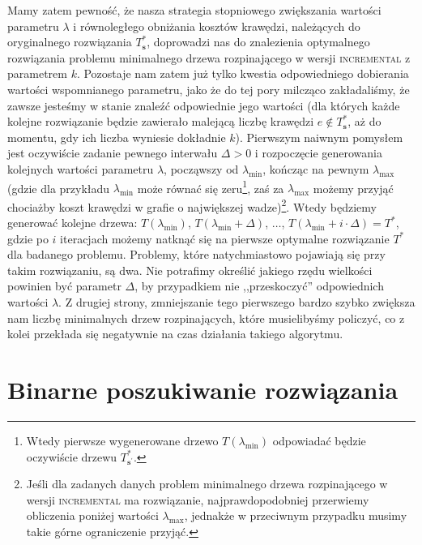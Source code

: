 Mamy zatem pewność, że nasza strategia stopniowego zwiększania wartości parametru $\lambda$ i równoległego obniżania kosztów krawędzi, należących do oryginalnego rozwiązania $T^{\ast}_{\textbf{s}}$, doprowadzi nas do znalezienia optymalnego rozwiązania problemu minimalnego drzewa rozpinającego w wersji \textsc{incremental} z parametrem $k$. Pozostaje nam zatem już tylko kwestia odpowiedniego dobierania wartości wspomnianego parametru, jako że do tej pory milcząco zakładaliśmy, że zawsze jesteśmy w stanie znaleźć odpowiednie jego wartości (dla których każde kolejne rozwiązanie będzie zawierało malejącą liczbę krawędzi $e \notin T^{\ast}_{\textbf{s}}$, aż do momentu, gdy ich liczba wyniesie dokładnie $k$). Pierwszym naiwnym pomysłem jest oczywiście zadanie pewnego interwału $\Delta > 0$ i rozpoczęcie generowania kolejnych wartości parametru $\lambda$, począwszy od $\lambda_{\text{min}}$, kończąc na pewnym $\lambda_{\text{max}}$ (gdzie dla przykładu $\lambda_{\text{min}}$ może równać się zeru\footnote{Wtedy pierwsze wygenerowane drzewo $T \left( \lambda_{\text{min}} \right)$ odpowiadać będzie oczywiście drzewu $T^{\ast}_{\textbf{s}^{\prime}}$.}, zaś za $\lambda_{\text{max}}$ możemy przyjąć chociażby koszt krawędzi w grafie o największej wadze)\footnote{Jeśli dla zadanych danych problem minimalnego drzewa rozpinającego w wersji \textsc{incremental} ma rozwiązanie, najprawdopodobniej przerwiemy obliczenia poniżej wartości $\lambda_{\text{max}}$, jednakże w przeciwnym przypadku musimy takie górne ograniczenie przyjąć.}. Wtedy będziemy generować kolejne drzewa: $T \left( \lambda_{\text{min}} \right)$, $T \left( \lambda_{\text{min}} + \Delta \right)$, $\dots$, $T \left( \lambda_{\text{min}} + i \cdot \Delta \right) = T^{\ast}$, gdzie po $i$ iteracjach możemy natknąć się na pierwsze optymalne rozwiązanie $T^{\ast}$ dla badanego problemu. Problemy, które natychmiastowo pojawiają się przy takim rozwiązaniu, są dwa. Nie potrafimy określić jakiego rzędu wielkości powinien być parametr $\Delta$, by przypadkiem nie ,,przeskoczyć'' odpowiednich wartości $\lambda$. Z drugiej strony, zmniejszanie tego pierwszego bardzo szybko zwiększa nam liczbę minimalnych drzew rozpinających, które musielibyśmy policzyć, co z kolei przekłada się negatywnie na czas działania takiego algorytmu.

\section{Binarne poszukiwanie rozwiązania}

